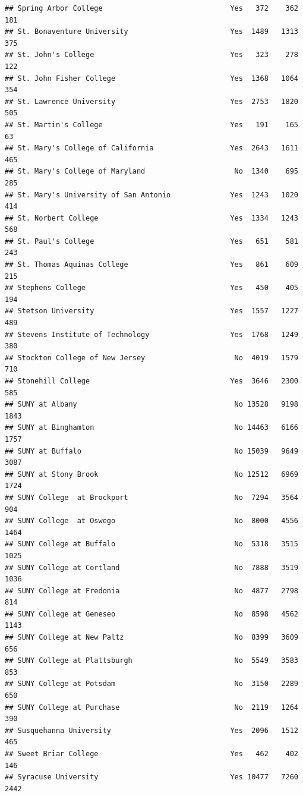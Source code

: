 \documentclass[
]{article}
\begin{document}
\begin{verbatim}
## Spring Arbor College                              Yes   372    362    181
## St. Bonaventure University                        Yes  1489   1313    375
## St. John's College                                Yes   323    278    122
## St. John Fisher College                           Yes  1368   1064    354
## St. Lawrence University                           Yes  2753   1820    505
## St. Martin's College                              Yes   191    165     63
## St. Mary's College of California                  Yes  2643   1611    465
## St. Mary's College of Maryland                     No  1340    695    285
## St. Mary's University of San Antonio              Yes  1243   1020    414
## St. Norbert College                               Yes  1334   1243    568
## St. Paul's College                                Yes   651    581    243
## St. Thomas Aquinas College                        Yes   861    609    215
## Stephens College                                  Yes   450    405    194
## Stetson University                                Yes  1557   1227    489
## Stevens Institute of Technology                   Yes  1768   1249    380
## Stockton College of New Jersey                     No  4019   1579    710
## Stonehill College                                 Yes  3646   2300    585
## SUNY at Albany                                     No 13528   9198   1843
## SUNY at Binghamton                                 No 14463   6166   1757
## SUNY at Buffalo                                    No 15039   9649   3087
## SUNY at Stony Brook                                No 12512   6969   1724
## SUNY College  at Brockport                         No  7294   3564    904
## SUNY College  at Oswego                            No  8000   4556   1464
## SUNY College at Buffalo                            No  5318   3515   1025
## SUNY College at Cortland                           No  7888   3519   1036
## SUNY College at Fredonia                           No  4877   2798    814
## SUNY College at Geneseo                            No  8598   4562   1143
## SUNY College at New Paltz                          No  8399   3609    656
## SUNY College at Plattsburgh                        No  5549   3583    853
## SUNY College at Potsdam                            No  3150   2289    650
## SUNY College at Purchase                           No  2119   1264    390
## Susquehanna University                            Yes  2096   1512    465
## Sweet Briar College                               Yes   462    402    146
## Syracuse University                               Yes 10477   7260   2442

\end{verbatim}
\end{document}
